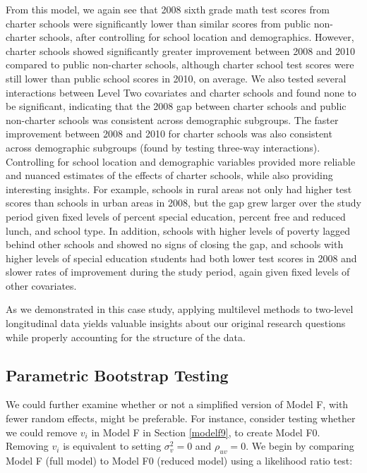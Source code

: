 \documentclass[
]{krantz}
\begin{document}
From this model, we again see that 2008 sixth grade math test scores from charter schools were significantly lower than similar scores from public non-charter schools, after controlling for school location and demographics. However, charter schools showed significantly greater improvement between 2008 and 2010 compared to public non-charter schools, although charter school test scores were still lower than public school scores in 2010, on average. We also tested several interactions between Level Two covariates and charter schools and found none to be significant, indicating that the 2008 gap between charter schools and public non-charter schools was consistent across demographic subgroups. The faster improvement between 2008 and 2010 for charter schools was also consistent across demographic subgroups (found by testing three-way interactions). Controlling for school location and demographic variables provided more reliable and nuanced estimates of the effects of charter schools, while also providing interesting insights. For example, schools in rural areas not only had higher test scores than schools in urban areas in 2008, but the gap grew larger over the study period given fixed levels of percent special education, percent free and reduced lunch, and school type. In addition, schools with higher levels of poverty lagged behind other schools and showed no signs of closing the gap, and schools with higher levels of special education students had both lower test scores in 2008 and slower rates of improvement during the study period, again given fixed levels of other covariates.

As we demonstrated in this case study, applying multilevel methods to two-level longitudinal data yields valuable insights about our original research questions while properly accounting for the structure of the data.

\subsection{Parametric Bootstrap Testing}\label{longitudinal-paraboot}

We could further examine whether or not a simplified version of Model F, with fewer random effects, might be preferable. For instance, consider testing whether we could remove \(v_i\) in Model F in Section \ref{modelf9}, to create Model F0. Removing \(v_i\) is equivalent to setting \(\sigma_{v}^{2} = 0\) and \(\rho_{uv} = 0\). We begin by comparing Model F (full model) to Model F0 (reduced model) using a likelihood ratio test:
\end{document}
